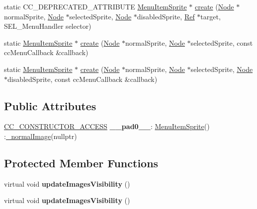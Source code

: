 \begin{DoxyCompactItemize}
\item 
static C\+C\+\_\+\+D\+E\+P\+R\+E\+C\+A\+T\+E\+D\+\_\+\+A\+T\+T\+R\+I\+B\+U\+TE \hyperlink{classMenuItemSprite}{Menu\+Item\+Sprite} $\ast$ \hyperlink{classMenuItemSprite_abceba9cbe4ceca1114943a78f35991ba}{create} (\hyperlink{classNode}{Node} $\ast$normal\+Sprite, \hyperlink{classNode}{Node} $\ast$selected\+Sprite, \hyperlink{classNode}{Node} $\ast$disabled\+Sprite, \hyperlink{classRef}{Ref} $\ast$target, S\+E\+L\+\_\+\+Menu\+Handler selector)
\item 
static \hyperlink{classMenuItemSprite}{Menu\+Item\+Sprite} $\ast$ \hyperlink{classMenuItemSprite_a35e7a06854e600975e52e84800060409}{create} (\hyperlink{classNode}{Node} $\ast$normal\+Sprite, \hyperlink{classNode}{Node} $\ast$selected\+Sprite, const cc\+Menu\+Callback \&callback)
\item 
static \hyperlink{classMenuItemSprite}{Menu\+Item\+Sprite} $\ast$ \hyperlink{classMenuItemSprite_a61f865d1132532026c4bee8a55ce9a50}{create} (\hyperlink{classNode}{Node} $\ast$normal\+Sprite, \hyperlink{classNode}{Node} $\ast$selected\+Sprite, \hyperlink{classNode}{Node} $\ast$disabled\+Sprite, const cc\+Menu\+Callback \&callback)
\end{DoxyCompactItemize}
\subsection*{Public Attributes}
\begin{DoxyCompactItemize}
\item 
\mbox{\label{classMenuItemSprite_a05186b19a43e6d90932bf5dc56ef5994}} 
\hyperlink{_2cocos2d_2cocos_2base_2ccConfig_8h_a25ef1314f97c35a2ed3d029b0ead6da0}{C\+C\+\_\+\+C\+O\+N\+S\+T\+R\+U\+C\+T\+O\+R\+\_\+\+A\+C\+C\+E\+SS} {\bfseries \+\_\+\+\_\+pad0\+\_\+\+\_\+}\+: \hyperlink{classMenuItemSprite}{Menu\+Item\+Sprite}() \+:\hyperlink{classMenuItemSprite_ab3c368fb04937be8da28053aab3a7c06}{\+\_\+normal\+Image}(nullptr)
\end{DoxyCompactItemize}
\subsection*{Protected Member Functions}
\begin{DoxyCompactItemize}
\item 
\mbox{\label{classMenuItemSprite_aaf15f2318dd1bc0d995c7b770dee358a}} 
virtual void {\bfseries update\+Images\+Visibility} ()
\item 
\mbox{\label{classMenuItemSprite_a886bbe68955c5b028444c8a7418fdb7e}} 
virtual void {\bfseries update\+Images\+Visibility} ()
\end{DoxyCompactItemize}
